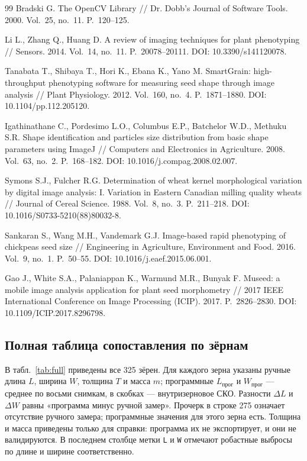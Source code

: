 \documentclass[12pt,a4paper]{article}
\begin{document}
\begin{thebibliography}{99}
Bradski G. The OpenCV Library // Dr. Dobb's Journal of Software Tools.
2000. Vol.~25, no.~11. P.~120--125.

Li L., Zhang Q., Huang D. A review of imaging techniques for plant
phenotyping // Sensors. 2014. Vol.~14, no.~11. P.~20078--20111.
DOI: 10.3390/s141120078.

Tanabata T., Shibaya T., Hori K., Ebana K., Yano M. SmartGrain:
high-throughput phenotyping software for measuring seed shape through image
analysis // Plant Physiology. 2012. Vol.~160, no.~4. P.~1871--1880.
DOI: 10.1104/pp.112.205120.

Igathinathane C., Pordesimo L.O., Columbus E.P., Batchelor W.D.,
Methuku S.R. Shape identification and particles size distribution from
basic shape parameters using ImageJ // Computers and Electronics in
Agriculture. 2008. Vol.~63, no.~2. P.~168--182.
DOI: 10.1016/j.compag.2008.02.007.

Symons S.J., Fulcher R.G. Determination of wheat kernel morphological
variation by digital image analysis: I. Variation in Eastern Canadian
milling quality wheats // Journal of Cereal Science. 1988. Vol.~8, no.~3.
P.~211--218. DOI: 10.1016/S0733-5210(88)80032-8.

Sankaran S., Wang M.H., Vandemark G.J. Image-based rapid phenotyping of
chickpeas seed size // Engineering in Agriculture, Environment and Food.
2016. Vol.~9, no.~1. P.~50--55. DOI: 10.1016/j.eaef.2015.06.001.

Gao J., White S.A., Palaniappan K., Warmund M.R., Bunyak F. Museed: a
mobile image analysis application for plant seed morphometry // 2017 IEEE
International Conference on Image Processing (ICIP). 2017. P.~2826--2830.
DOI: 10.1109/ICIP.2017.8296798.

\end{thebibliography}

\appendix

\begin{landscape}
\section{Полная таблица сопоставления по зёрнам}

В табл.~\ref{tab:full} приведены все 325 зёрен. Для каждого зерна указаны
ручные длина $L$, ширина $W$, толщина $T$ и масса $m$; программные
$L_{\text{прог}}$ и $W_{\text{прог}}$ — среднее по восьми снимкам, в
скобках — внутризерновое СКО. Разности $\Delta L$ и $\Delta W$ равны
«программа минус ручной замер». Прочерк в строке 275 означает
отсутствие ручного замера; программные значения для этого зерна есть.
Толщина и масса приведены только для справки: программа их не
экспортирует, и они не валидируются. В последнем столбце метки
\texttt{L} и \texttt{W} отмечают робастные выбросы по длине и ширине
соответственно.

\begingroup
\scriptsize
\setlength{\tabcolsep}{3pt}
\setlength{\LTcapwidth}{\linewidth}

\endgroup
\end{landscape}
\end{document}
